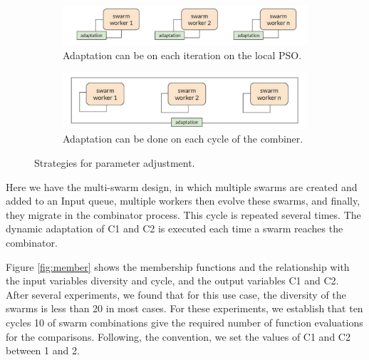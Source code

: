 \documentclass[graybox]{svmult}
\begin{document}
\begin{figure}[htbp]
  \centering
  \begin{subfigure}{0.8\textwidth}
    \includegraphics[angle=0,width=1\textwidth]{adaptation local.pdf}
    \caption{Adaptation can be on each iteration on the local PSO.}
    \label{fig:adap_local} 
  \end{subfigure}

  \begin{subfigure}{0.8\textwidth}
     \includegraphics[angle=0,width=1\textwidth]{adaptation combiner.pdf}
     \caption{Adaptation can be done on each cycle of the combiner.}
     \label{fig:adap_combiner} 
  \end{subfigure}
\caption{Strategies for parameter adjustment.}
\label{fig:adap}
\end{figure}

Here we have the multi-swarm design, in which multiple swarms are created and added to an Input queue, multiple workers then evolve these swarms, and finally, they migrate in the combinator process. This cycle is repeated several times. The dynamic adaptation of C1 and C2 is executed each time a swarm reaches the combinator.

Figure \ref{fig:member} shows the membership functions and the relationship with the input variables diversity and cycle, and the output variables C1 and C2. After several experiments, we found that for this use case, the diversity of the swarms is less than 20 in most cases. For these experiments, we establish that ten cycles 10 of swarm combinations give the required number of function evaluations for the comparisons. Following, the convention, we set the values of C1 and C2 between 1 and 2.
\end{document}
